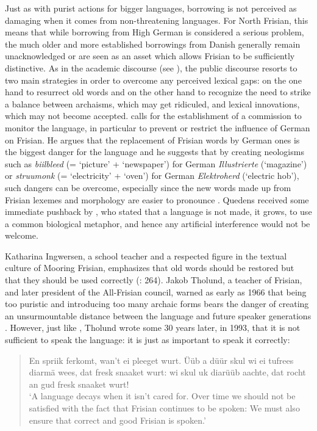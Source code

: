 \documentclass[output=paper]{langsci/langscibook}
\begin{document}
Just as with purist actions for bigger languages, borrowing is not perceived as damaging when it comes from non-threatening languages. For North Frisian, this means that while borrowing from High German is considered a serious problem, the much older and more established borrowings from Danish generally remain unacknowledged or are seen as an asset which allows Frisian to be sufficiently distinctive. As in the academic discourse (see ), the public discourse resorts to two main strategies in order to overcome any perceived lexical gaps: on the one hand to resurrect old words and on the other hand to recognize the need to strike a balance between archaisms, which may get ridiculed, and lexical innovations, which may not become accepted. \citet{Quedens1967} calls for the establishment of a commission to monitor the language, in particular to prevent or restrict the influence of German on Frisian. He argues that the replacement of Frisian words by German ones is the biggest danger for the language and he suggests that by creating neologisms such as \textit{biilbleed} (= ‘picture’ + ‘newspaper’) for German \textit{Illustrierte} (‘magazine’) or \textit{struumonk} (= ‘electricity’ + ‘oven’) for German \textit{Elektroherd} (‘electric hob’), such dangers can be overcome, especially since the new words made up from Frisian lexemes and morphology are easier to pronounce \citep[95]{Quedens1967}. Quedens received some immediate pushback by \citet{Preisler1968}, who stated that a language is not made, it grows, to use a common biological metaphor, and hence any artificial interference would not be welcome.

Katharina Ingwersen, a school teacher and a respected figure in the textual culture of Mooring Frisian, emphasizes that old words should be restored but that they should be used correctly (\citealt{Ingwersen1966}: 264). Jakob Tholund, a teacher of Frisian, and later president of the All-Frisian council, warned as early as 1966 that being too puristic and introducing too many archaic forms bears the danger of creating an unsurmountable distance between the language and future speaker generations \citep[31]{Tholund1966}. However, just like \citet{Ingwersen1966}, Tholund wrote some 30 years later, in 1993, that it is not sufficient to speak the language: it is just as important to speak it correctly: 

\begin{quote}
En spriik ferkomt, wan’t ei pleeget wurt. Üüb a düür skul wi ei tufrees diarmä wees, dat fresk snaaket wurt: wi skul uk diarüüb aachte, dat rocht an gud fresk snaaket wurt! \citep[17]{Tholund1993}\smallskip\\\relax
‘A language decays when it isn’t cared for. Over time we should not be satisfied with the fact that Frisian continues to be spoken: We must also ensure that correct and good Frisian is spoken.’
\end{quote}
\end{document}
